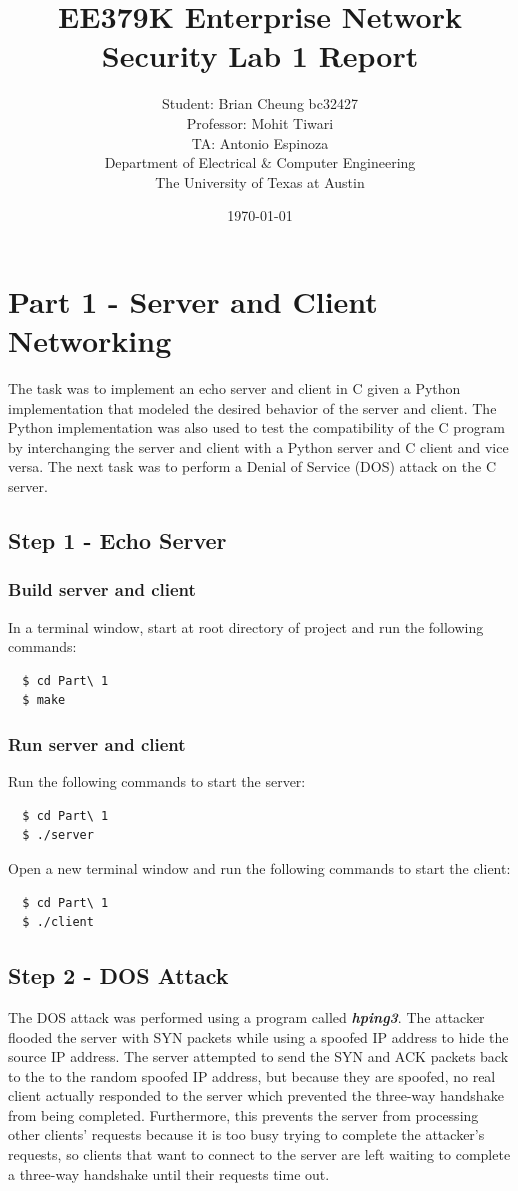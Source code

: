 \documentclass[11pt]{article}
\author{Student: Brian Cheung bc32427 \\ Professor: Mohit Tiwari \\ TA: Antonio Espinoza \\ Department of Electrical \& Computer Engineering \\ The University of Texas at Austin}
\date{\today}
\title{EE379K Enterprise Network Security Lab 1 Report}
\begin{document}
\maketitle
\section*{Part 1 - Server and Client Networking}
\label{sec:part-1}
The task was to implement an echo server and client in C given a Python implementation that modeled the desired behavior of the server and client.
The Python implementation was also used to test the compatibility of the C program by interchanging the server and client with a Python server and C client and vice versa.
The next task was to perform a Denial of Service (DOS) attack on the C server.
\subsection*{Step 1 - Echo Server}
\subsubsection*{Build server and client}
In a terminal window, start at root directory of project and run the following commands:
\begin{verbatim}
  $ cd Part\ 1
  $ make
\end{verbatim}
\subsubsection*{Run server and client}
Run the following commands to start the server:
\begin{verbatim}
  $ cd Part\ 1
  $ ./server
\end{verbatim}
Open a new terminal window and run the following commands to start the client:
\begin{verbatim}
  $ cd Part\ 1
  $ ./client
\end{verbatim}
\subsection*{Step 2 - DOS Attack}
The DOS attack was performed using a program called \textbf{\emph{hping3}}.
The attacker flooded the server with SYN packets while using a spoofed IP address to hide the source IP address.
The server attempted to send the SYN and ACK packets back to the to the random spoofed IP address, but because they are spoofed,
no real client actually responded to the server
which prevented the three-way handshake from being completed.
Furthermore, this prevents the server from processing other clients' requests because it is too busy trying to complete the attacker's requests,
so clients that want to connect to the server are left waiting to complete a three-way handshake until their requests time out.
\end{document}
